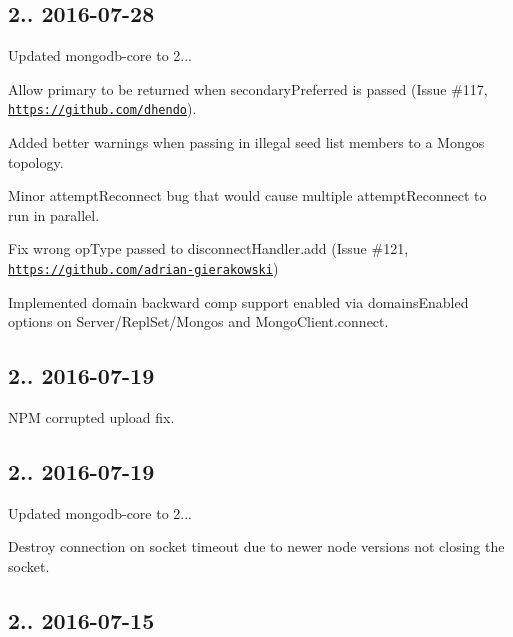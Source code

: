 \subsection*{2.. 2016-\/07-\/28 }


\begin{DoxyItemize}
\item Updated mongodb-\/core to 2...
\item Allow primary to be returned when secondary\+Preferred is passed (Issue \#117, \href{https://github.com/dhendo}{\tt https\+://github.\+com/dhendo}).
\item Added better warnings when passing in illegal seed list members to a Mongos topology.
\item Minor attempt\+Reconnect bug that would cause multiple attempt\+Reconnect to run in parallel.
\item Fix wrong op\+Type passed to disconnect\+Handler.\+add (Issue \#121, \href{https://github.com/adrian-gierakowski}{\tt https\+://github.\+com/adrian-\/gierakowski})
\item Implemented domain backward comp support enabled via domains\+Enabled options on Server/\+Repl\+Set/\+Mongos and Mongo\+Client.\+connect.
\end{DoxyItemize}

\subsection*{2.. 2016-\/07-\/19 }


\begin{DoxyItemize}
\item N\+PM corrupted upload fix.
\end{DoxyItemize}

\subsection*{2.. 2016-\/07-\/19 }


\begin{DoxyItemize}
\item Updated mongodb-\/core to 2...
\item Destroy connection on socket timeout due to newer node versions not closing the socket.
\end{DoxyItemize}

\subsection*{2.. 2016-\/07-\/15 }


